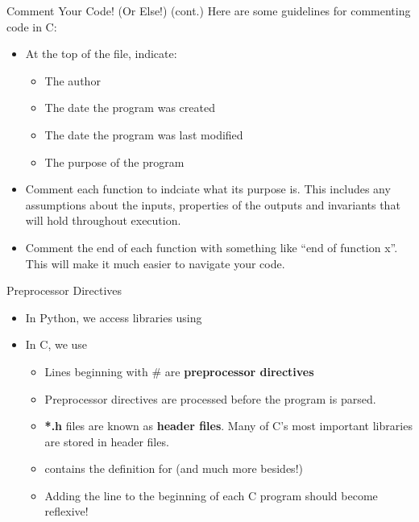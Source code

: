 \documentclass[11pt]{beamer}
\let\OldTexttt\texttt
\renewcommand{\texttt}[1]{\OldTexttt{\color{teal}{#1}}}
\begin{document}
\begin{frame}{Comment Your Code! (Or Else!) (cont.)}
Here are some guidelines for commenting code in C:
\begin{itemize}
\item At the top of the file, indicate:
	\begin{itemize}
	\item The author
	\item The date the program was created
	\item The date the program was last modified
	\item The purpose of the program
	\end{itemize}
\item Comment each function to indciate what its purpose is.  This includes any assumptions about the inputs, properties of the outputs and invariants that will hold throughout execution.
\item Comment the end of each function with something like ``end of function x''.  This will make it much easier to navigate your code.
\end{itemize}
\end{frame}

\begin{frame}{Preprocessor Directives}
\begin{itemize}
\item In Python, we access libraries using \texttt{import ...}
\item In C, we use \texttt{\#include<...>}
\begin{itemize}
\item Lines beginning with \# are \textbf{preprocessor directives}
\item Preprocessor directives are processed before the program is parsed.  
\item \textbf{*.h} files are known as \textbf{header files}.  Many of C's most important libraries are stored in header files.  
\item \texttt{stdio.h} contains the definition for \texttt{printf} (and much more besides!)  
\item Adding the line \texttt{\#include<stdio.h>} to the beginning of each C program should become reflexive! 
\end{itemize}
\end{itemize}
\end{frame}
\end{document}
